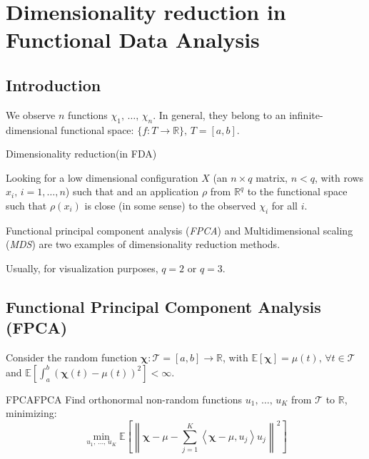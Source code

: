 \chapter{Dimensionality reduction in Functional Data Analysis}

\section{Introduction}
We observe $n$ functions $\chi_1,\, \dots,\, \chi_n$. In general,
they belong to an infinite-dimensional functional space:
$\{f: T \to \mathds R\},\,T = [a, b]$.
\begin{problem}{Dimensionality reduction}{}(in FDA)

Looking for a low dimensional configuration $X$
(an $n \times q$ matrix, $n < q$, with rows $x_i,\,i=1,\dots,n$) such that
and an application $\rho$ from $\mathds R^q$ to the functional space such
that $\rho(x_i)$ is close (in some sense) to the observed $\chi_i$ for all $i$.

\tcblower

Functional principal component analysis (\emph{FPCA}) and
Multidimensional scaling (\emph{MDS}) are two examples of dimensionality reduction methods.


\begin{note}
	Usually, for visualization purposes, $q=2$ or $q=3$.
\end{note}
\end{problem}

\pagebreak
\section{Functional Principal Component Analysis (FPCA)}

Consider the random function $\boldsymbol \chi : \mathcal T = [a, b] \to \mathds R$,
with $\mathds E [\boldsymbol \chi] = \mu(t),\, \forall t \in \mathcal T$ and
$\mathds E \left[ \int_a^b \left( \boldsymbol \chi(t) - \mu(t) \right)^2 \right] < \infty$.

\begin{problem}{FPCA}{FPCA}
Find orthonormal non-random functions $u_1,\, \dots,\, u_K$ from $\mathcal T$ to $\mathds R$,
minimizing:
\begin{equation*}
	\min_{u_1,\, \dots,\, u_K} \mathds E \left[
		\left\lVert
		\boldsymbol \chi - \mu - \sum_{j=1}^K \left\langle
		\boldsymbol \chi - \mu, u_j
		\right\rangle u_j
		\right\rVert^2
		\right]
\end{equation*}
\end{problem}

